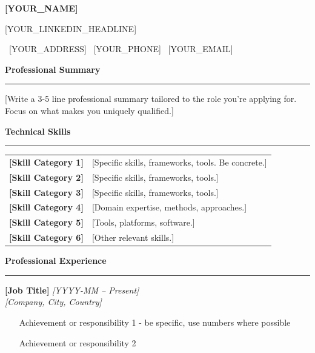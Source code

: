 \documentclass[10pt,a4paper]{article}
\newcommand{\sectiontitle}[1]{
    \vspace{0.2cm}
    \textcolor{primarycolor}{\large\textbf{#1}}
    \par\noindent\textcolor{primarycolor}{\rule{\textwidth}{0.8pt}}
    \vspace{0.05cm}
}
\newcommand{\daterange}[1]{{\textcolor{secondarycolor}{\textit{#1}}}}
\newcommand{\jobtitle}[1]{{\textbf{#1}}}
\newcommand{\organization}[1]{{\textit{#1}}}
\newcommand{\contactitem}[2]{#1 \ #2 \hspace{0.25cm}}
\begin{document}
\begin{center}
    {\Large\textbf{[YOUR_NAME]}}

    \vspace{0.05cm}

    {\small [YOUR_LINKEDIN_HEADLINE]}

    \vspace{0.1cm}

    \small{\contactitem{\faMapMarker*}{[YOUR_ADDRESS]}
    \contactitem{\faMobile*}{[YOUR_PHONE]}
    \contactitem{\faEnvelope}{[YOUR_EMAIL]}}
\end{center}

\sectiontitle{Professional Summary}
\vspace{-0.05cm}
[Write a 3-5 line professional summary tailored to the role you're applying for. Focus on what makes you uniquely qualified.]

\sectiontitle{Technical Skills}
\vspace{-0.05cm}
\small
\begin{tabular}{@{} l p{13.5cm} @{}}
\textbf{[Skill Category 1]} & [Specific skills, frameworks, tools. Be concrete.] \\
\textbf{[Skill Category 2]} & [Specific skills, frameworks, tools.] \\
\textbf{[Skill Category 3]} & [Specific skills, frameworks, tools.] \\
\textbf{[Skill Category 4]} & [Domain expertise, methods, approaches.] \\
\textbf{[Skill Category 5]} & [Tools, platforms, software.] \\
\textbf{[Skill Category 6]} & [Other relevant skills.] \\
\end{tabular}
\normalsize

\sectiontitle{Professional Experience}
\vspace{-0.05cm}
\jobtitle{[Job Title]} \hfill \daterange{[YYYY-MM -- Present]}\\
\organization{[Company, City, Country]}
\begin{itemize}[leftmargin=*,noitemsep,topsep=0.05cm,parsep=0pt]
    \item [Achievement or responsibility 1 - be specific, use numbers where possible]
    \item [Achievement or responsibility 2]
\end{itemize}
\end{document}
